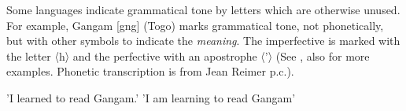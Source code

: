 \documentclass[output=paper]{langscibook}
\begin{document}
    
Some languages indicate grammatical tone by letters which are otherwise unused. For example, Gangam [gng] (Togo) marks grammatical tone, not phonetically, but with other symbols to indicate the \textit{meaning}. The imperfective is marked with the letter 〈h〉 and the perfective with an apostrophe 〈’〉 (See \citealt{HigdonEtAl2000}, also \citealt{Roberts2013} for more examples. Phonetic transcription is from Jean Reimer p.c.).

    \begin{exe}
        \ex \label{ex:ToneByUnusedLetters:3}
        \begin{xlist}
               \glt  'I learned to read Gangam.'
                \glt 'I am learning to read Gangam'
        \end{xlist}
    \end{exe}
    
\end{document}
